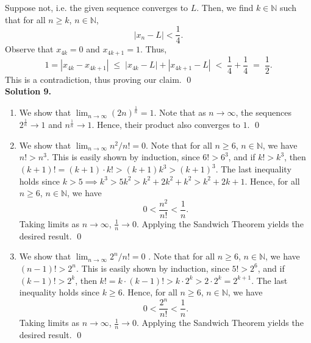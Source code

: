 \documentclass[10pt]{article}
\begin{document}
        Suppose not, i.e. the given sequence converges to $L$. Then, we find $k \in \mathbb{N}$ such that for all $n \ge k$, $n \in \mathbb{N}$,
        \[|x_n - L| < \frac{1}{4}.\]
        Observe that $x_{4k} = 0$ and  $x_{4k + 1} = 1$. Thus,
        \[1 = |x_{4k} - x_{4k + 1}| \;\le\; |x_{4k} - L| + |x_{4k + 1} - L| 
        \;<\; \frac{1}{4} + \frac{1}{4} \;=\; \frac{1}{2}. \]
        This is a contradiction, thus proving our claim. \qed\\
        
        \clearpage
        \textbf{Solution 9.}
        \begin{enumerate}
                \item We show that $\lim_{n\to\infty} (2n)^\frac{1}{n} = 1$.
                Note that as $n \to \infty$, the sequences $2^{\frac{1}{n}} \to 1$ and $n^{\frac{1}{n}} \to 1$.
                Hence, their product also converges to $1$. \qed\\

                \item We show that $\lim_{n\to\infty} n^2 /n! = 0$. Note that for all $n \ge 6$, $n \in \mathbb{N}$, we have $n! > n^3$.
                This is easily shown by induction, since $6! > 6^3$, and if $k! > k^3$, then
                $(k + 1)! = (k + 1)\cdot k! > (k + 1)k^3 > (k + 1)^3$.
                The last inequality holds since $k > 5 \implies k^3 > 5k^2 > k^2 + 2k^2 + k^2 > k^2 + 2k + 1$.
                Hence, for all $n \ge 6$, $n \in \mathbb{N}$, we have
                \[0 < \frac{n^2}{n!} < \frac{1}{n}.\]
                Taking limits as $n\to\infty$, $\frac{1}{n} \to 0$. Applying the Sandwich Theorem yields the desired result. \qed\\

                \item We show that $\lim_{n\to\infty} 2^n/n! = 0$ . Note that for all $n \ge 6$, $n \in \mathbb{N}$, we have $(n - 1)! > 2^n$.
                This is easily shown by induction, since $5! > 2^6$, and if $(k - 1)! > 2^k$, then
                $k! = k \cdot (k - 1)! > k\cdot 2^k > 2 \cdot 2^k = 2^{k + 1}$. The last inequality holds since $k \ge 6$.
                Hence, for all $n \ge 6$, $n \in \mathbb{N}$, we have
                \[
                0 < \frac{2^n}{n!} < \frac{1}{n}.
                \]
                Taking limits as $n\to\infty$, $\frac{1}{n} \to 0$. Applying the Sandwich Theorem yields the desired result. \qed\\
        \end{enumerate}
\end{document}
